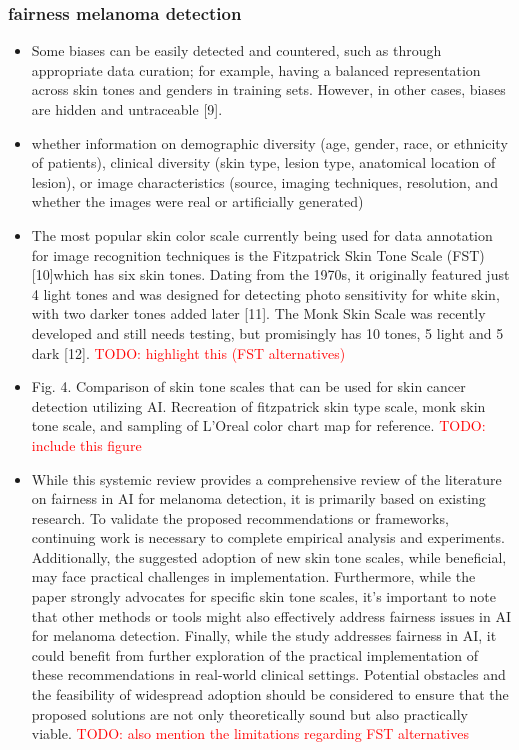 \documentclass[12pt, a4paper, oneside]{book}   	%
\renewcommand{\todo}[1]{\textcolor{red}{TODO: #1}}
\renewcommand{\paragraph}[1]{%
	\subsubsection*{#1}%
}
\begin{document}
		\paragraph{fairness melanoma detection}
		\begin{itemize}
			\item Some biases can be easily detected and countered, such as through appropriate data curation; for example, having a balanced representation across skin tones and genders in training sets. However, in other cases, biases are hidden and untraceable [9]. \autocite{Montoya_2025}
			\item whether information on demographic diversity (age, gender, race, or ethnicity of patients), clinical diversity (skin type, lesion type, anatomical location of lesion), or image characteristics (source, imaging techniques, resolution, and whether the images were real or artificially generated) \autocite{Montoya_2025}
			\item The most popular skin color scale currently being used for data annotation for image recognition techniques is the Fitzpatrick Skin Tone Scale (FST) [10]which has six skin tones. Dating from the 1970s, it originally featured just 4 light tones and was designed for detecting photo sensitivity for white skin, with two darker tones added later [11]. The Monk Skin Scale was recently developed and still needs testing, but promisingly has 10 tones, 5 light and 5 dark [12].\autocite{Montoya_2025} \todo{highlight this (FST alternatives)}
			\item Fig. 4. Comparison of skin tone scales that can be used for skin cancer detection utilizing \gls{AI}. Recreation of fitzpatrick skin type scale, monk skin tone scale, and sampling of L’Oreal color chart map for reference. \autocite{Montoya_2025} \todo{include this figure}
			\item While this systemic review provides a comprehensive review of the literature on fairness in \gls{AI} for melanoma detection, it is primarily based on existing research. To validate the proposed recommendations or frameworks, continuing work is necessary to complete empirical analysis and experiments. Additionally, the suggested adoption of new skin tone scales, while beneficial, may face practical challenges in implementation. Furthermore, while the paper strongly advocates for specific skin tone scales, it’s important to note that other methods or tools might also effectively address fairness issues in \gls{AI} for melanoma detection. Finally, while the study addresses fairness in \gls{AI}, it could benefit from further exploration of the practical implementation of these recommendations in real-world clinical settings. Potential obstacles and the feasibility of widespread adoption should be considered to ensure that the proposed solutions are not only theoretically sound but also practically viable. \autocite{Montoya_2025} \todo{also mention the limitations regarding FST alternatives}

\end{itemize}
\end{document}
